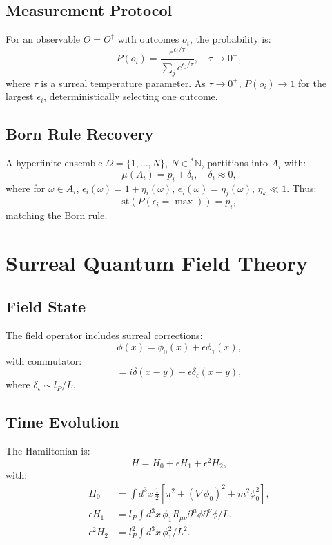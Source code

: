 \documentclass{article}
\begin{document}
\subsection{Measurement Protocol}
For an observable \(O = O^\dagger\) with outcomes \(o_i\), the probability is:
\begin{equation}
P(o_i) = \frac{e^{\epsilon_i / \tau}}{\sum_j e^{\epsilon_j / \tau}}, \quad \tau \to 0^+,
\end{equation}
where \(\tau\) is a surreal temperature parameter. As \(\tau \to 0^+\), \(P(o_i) \to 1\) for the largest \(\epsilon_i\), deterministically selecting one outcome.

\subsection{Born Rule Recovery}
A hyperfinite ensemble \(\Omega = \{1, \dots, N\}\), \(N \in {}^*\mathbb{N}\), partitions into \(A_i\) with:
\begin{equation}
\mu(A_i) = p_i + \delta_i, \quad \delta_i \approx 0,
\end{equation}
where for \(\omega \in A_i\), \(\epsilon_i(\omega) = 1 + \eta_i(\omega)\), \(\epsilon_j(\omega) = \eta_j(\omega)\), \(\eta_k \ll 1\). Thus:
\begin{equation}
\text{st}(P(\epsilon_i = \max)) = p_i,
\end{equation}
matching the Born rule.

\section{Surreal Quantum Field Theory}
\subsection{Field State}
The field operator includes surreal corrections:
\begin{equation}
\phi(x) = \phi_0(x) + \epsilon \phi_1(x),
\end{equation}
with commutator:
\begin{equation}
[\phi(x), \pi(y)] = i \delta(x-y) + \epsilon \delta_\epsilon(x-y),
\end{equation}
where \(\delta_\epsilon \sim l_P / L\).

\subsection{Time Evolution}
The Hamiltonian is:
\begin{equation}
H = H_0 + \epsilon H_1 + \epsilon^2 H_2,
\end{equation}
with:
\begin{align}
H_0 &= \int d^3x \, \frac{1}{2} [\pi^2 + (\nabla \phi_0)^2 + m^2 \phi_0^2], \\
\epsilon H_1 &= l_P \int d^3x \, \phi_1 R_{\mu\nu} \partial^\mu \phi \partial^\nu \phi / L, \\
\epsilon^2 H_2 &= l_P^2 \int d^3x \, \phi_1^2 / L^2.
\end{align}
\end{document}
